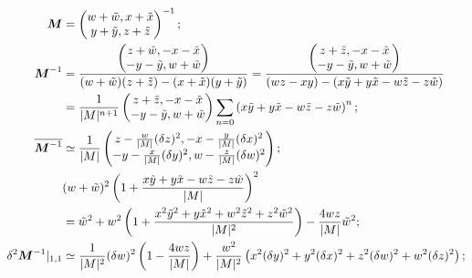\documentclass[twoside]{article}
\numberwithin{equation}{section}
\begin{document}
\begin{align*}
\protect{\textrm{\boldmath $M$}} &= \left( \begin{matrix} w + \tilde{w}, x + \tilde{x} \\ y + \tilde{y}, z + \tilde{z} \end{matrix} \right)^{-1}; \\
\protect{\textrm{\boldmath $M$}}^{-1} &= \frac{\left( \begin{matrix} z + \tilde{w}, - x - \tilde{x} \\ - y -\tilde{y}, w + \tilde{w} \end{matrix} \right)}
			    		 {(w + \tilde{w})(z + \tilde{z}) - (x + \tilde{x})(y + \tilde{y})} 
	= \frac{\left( \begin{matrix} z + \tilde{z}, - x - \tilde{x} \\ - y -\tilde{y}, w + \tilde{w} \end{matrix} \right)}
			    {(w z - x y) - (x \tilde{y} + y \tilde{x} - w \tilde{z} - z \tilde{w})} \\
	&= \frac{1}{|M|^{n+1}} \left( \begin{matrix} z + \tilde{z}, - x - \tilde{x} \\ - y -\tilde{y}, w + \tilde{w} \end{matrix} \right)
	      \sum_{n=0} \left( x \tilde{y} + y \tilde{x} - w \tilde{z} - z \tilde{w} \right)^n; \\
\overline{\protect{\textrm{\boldmath $M$}}^{-1}} &\simeq \frac{1}{|M|} \left( \begin{matrix} 
			z - \frac{w}{|M|} (\delta z)^2, 
			- x - \frac{y}{|M|} (\delta x)^2 \\ 
			- y - \frac{x}{|M|} (\delta y)^2, 
			w -  \frac{z}{|M|} (\delta w)^2 \end{matrix} \right); \\
& (w + \tilde{w})^2 \left( 1 + \frac{x \tilde{y} + y \tilde{x} - w \tilde{z} - z \tilde{w}}{|M|}  \right)^2 \\
	 &= \tilde{w}^2 + w^2 \left( 1 + \frac{x^2 \tilde{y}^2 + y \tilde{x}^2 + w^2 \tilde{z}^2 + z^2 \tilde{w}^2 }{|M|^2} \right) - \frac{4 w z}{|M|} \tilde{w}^2; \\
\delta^2 \protect{\textrm{\boldmath $M$}}^{-1}|_{1,1} &\simeq \frac{1}{|M|^2}  
			(\delta w)^2 \left(1 - \frac{4 w z}{|M|} \right) + \frac{w^2}{|M|^2} \left(x^2 (\delta y)^2 + y^2 (\delta x)^2 + z^2 (\delta w)^2 + w^2 (\delta z)^2 \right); \\
\end{align*}

\fi
\end{document}
